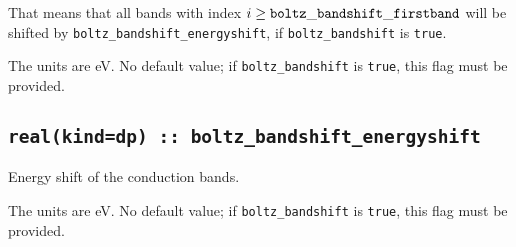 That means that all bands with index $i\ge {\tt boltz\_bandshift\_firstband}$ will be shifted by  {\tt boltz\_bandshift\_energyshift}, if {\tt boltz\_bandshift} is \verb#true#.

The units are eV.
No default value; if {\tt boltz\_bandshift} is \verb#true#, this flag must be provided.

\subsection[boltz\_bandshift\_energyshift]{\tt real(kind=dp) :: boltz\_bandshift\_energyshift}
Energy shift of the conduction bands.

The units are eV.
No default value; if {\tt boltz\_bandshift} is \verb#true#, this flag must be provided.



